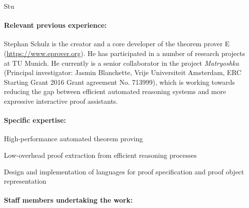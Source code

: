 \begin{sitedescription}{Stu}
\begin{compactitem}
\item
\end{compactitem}


\paragraph{Relevant previous experience:}

Stephan Schulz is the creator and a core developer of the theorem
prover E (\url{https://www.eprover.org}).  He has participated in a
number of research projects at TU Munich. He currently is a senior
collaborator in the project \emph{Matryoshka} (Principal investigator:
Jasmin Blanchette, Vrije Universiteit Amsterdam, ERC Starting Grant
2016 Grant agreement No. 713999), which is working towards reducing
the gap between efficient automated reasoning systems and more
expressive interactive proof assistants.
  
\paragraph{Specific expertise:}

\begin{compactitem}
\item High-performance automated theorem proving
\item Low-overhead proof extraction from efficient reasoning processes
\item Design and implementation of languages for proof specification
  and proof object representation
\end{compactitem}

\paragraph{Staff members undertaking the work:}



\end{sitedescription}

